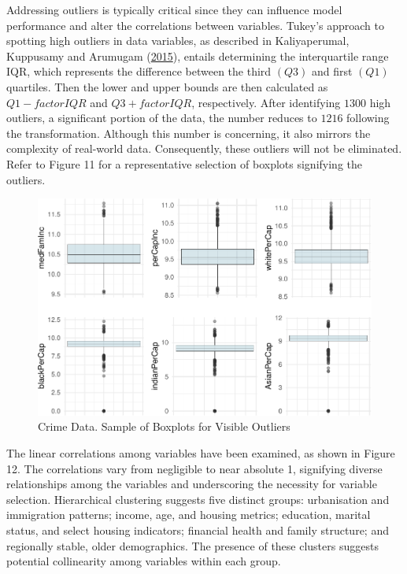 \documentclass[
  11pt,
]{article}
\begin{document}
Addressing outliers is typically critical since they can influence model
performance and alter the correlations between variables. Tukey's
approach to spotting high outliers in data variables, as described in
Kaliyaperumal, Kuppusamy and Arumugam
(\protect\hyperlink{ref-Kaliyaperumal2015}{2015}), entails determining
the interquartile range IQR, which represents the difference between the
third \((Q3)\) and first \((Q1)\) quartiles. Then the lower and upper
bounds are then calculated as \(Q1 - factorIQR\) and \(Q3 + factorIQR\),
respectively. After identifying \(1300\) high outliers, a significant
portion of the data, the number reduces to \(1216\) following the
transformation. Although this number is concerning, it also mirrors the
complexity of real-world data. Consequently, these outliers will not be
eliminated. Refer to Figure 11 for a representative selection of
boxplots signifying the outliers.

\begin{figure}[H]

{\centering \includegraphics[width=1\linewidth]{dissertation_files/figure-latex/Box Plot-1} 

}

\caption{Crime Data. Sample of Boxplots for Visible Outliers}\label{fig:Box Plot}
\end{figure}

The linear correlations among variables have been examined, as shown in
Figure 12. The correlations vary from negligible to near absolute 1,
signifying diverse relationships among the variables and underscoring
the necessity for variable selection. Hierarchical clustering suggests
five distinct groups: urbanisation and immigration patterns; income,
age, and housing metrics; education, marital status, and select housing
indicators; financial health and family structure; and regionally
stable, older demographics. The presence of these clusters suggests
potential collinearity among variables within each group.
\end{document}
